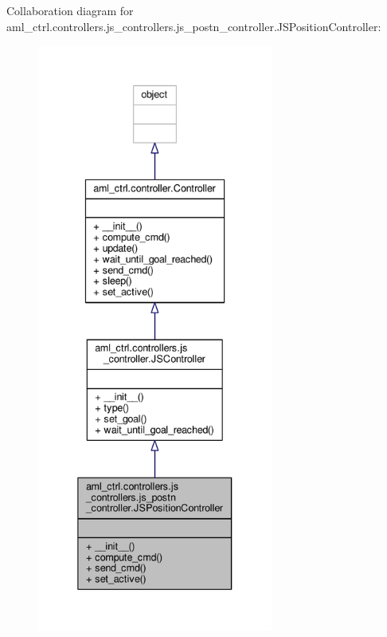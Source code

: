 Collaboration diagram for aml\-\_\-ctrl.\-controllers.\-js\-\_\-controllers.\-js\-\_\-postn\-\_\-controller.\-J\-S\-Position\-Controller\-:\nopagebreak
\begin{figure}[H]
\begin{center}
\leavevmode
\includegraphics[height=550pt]{classaml__ctrl_1_1controllers_1_1js__controllers_1_1js__postn__controller_1_1_j_s_position_controller__coll__graph}
\end{center}
\end{figure}
